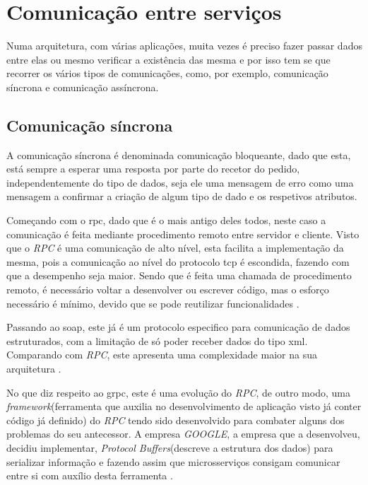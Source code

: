 \section{Comunicação entre serviços}

Numa arquitetura, com várias aplicações, muita vezes é preciso fazer passar dados entre elas ou mesmo verificar a existência das mesma e por isso tem se que recorrer os vários tipos de comunicações, como, por exemplo, comunicação síncrona e comunicação assíncrona. 

\subsection{Comunicação síncrona}

A comunicação síncrona é denominada comunicação bloqueante, dado que esta, está sempre a esperar uma resposta por parte do recetor do pedido, independentemente do tipo de dados, seja ele uma mensagem de erro como uma mensagem a confirmar a criação de algum tipo de dado e os respetivos atributos.

Começando com o \ac{rpc}, dado que é o mais antigo deles todos, neste caso a comunicação é feita mediante procedimento remoto entre servidor e cliente. Visto que o \textit{RPC} é uma comunicação de alto nível, esta facilita a implementação da mesma, pois a comunicação ao nível do protocolo \ac{tcp} é escondida, fazendo com que a desempenho seja maior. Sendo que é feita uma chamada de procedimento remoto, é necessário voltar a desenvolver ou escrever código, mas o esforço necessário é mínimo, devido que se pode reutilizar funcionalidades \cite{rpc}.

Passando ao \ac{soap}, este já é um protocolo especifico para comunicação de dados estruturados, com a limitação de só poder receber dados do tipo \ac{xml}. Comparando com \textit{RPC}, este apresenta uma complexidade maior na sua arquitetura \cite{SOAPREST}.

No que diz respeito ao \ac{grpc}, este é uma evolução do \textit{RPC}, de outro modo, uma \textit{framework}(ferramenta que auxilia no desenvolvimento de aplicação visto já conter código já definido) do \textit{RPC} tendo sido desenvolvido para combater alguns dos problemas do seu antecessor. A empresa \textit{GOOGLE}, a empresa que a desenvolveu, decidiu implementar, \textit{Protocol Buffers}(descreve a estrutura dos dados) para serializar informação e fazendo assim que microsserviços consigam comunicar entre si com auxílio desta ferramenta \cite{gRPC}.

